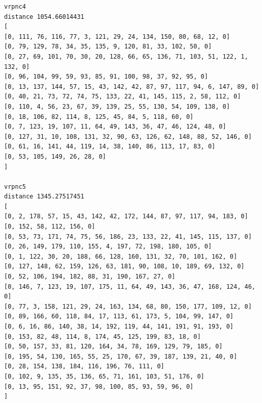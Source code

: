 \documentclass{article} %
\begin{document}
\begin{lstlisting}[breaklines, basicstyle=\tiny]
vrpnc4
distance 1054.66014431
[
[0, 111, 76, 116, 77, 3, 121, 29, 24, 134, 150, 80, 68, 12, 0]
[0, 79, 129, 78, 34, 35, 135, 9, 120, 81, 33, 102, 50, 0]
[0, 27, 69, 101, 70, 30, 20, 128, 66, 65, 136, 71, 103, 51, 122, 1, 132, 0]
[0, 96, 104, 99, 59, 93, 85, 91, 100, 98, 37, 92, 95, 0]
[0, 13, 137, 144, 57, 15, 43, 142, 42, 87, 97, 117, 94, 6, 147, 89, 0]
[0, 40, 21, 73, 72, 74, 75, 133, 22, 41, 145, 115, 2, 58, 112, 0]
[0, 110, 4, 56, 23, 67, 39, 139, 25, 55, 130, 54, 109, 138, 0]
[0, 18, 106, 82, 114, 8, 125, 45, 84, 5, 118, 60, 0]
[0, 7, 123, 19, 107, 11, 64, 49, 143, 36, 47, 46, 124, 48, 0]
[0, 127, 31, 10, 108, 131, 32, 90, 63, 126, 62, 148, 88, 52, 146, 0]
[0, 61, 16, 141, 44, 119, 14, 38, 140, 86, 113, 17, 83, 0]
[0, 53, 105, 149, 26, 28, 0]
]

vrpnc5
distance 1345.27517451
[
[0, 2, 178, 57, 15, 43, 142, 42, 172, 144, 87, 97, 117, 94, 183, 0]
[0, 152, 58, 112, 156, 0]
[0, 53, 73, 171, 74, 75, 56, 186, 23, 133, 22, 41, 145, 115, 137, 0]
[0, 26, 149, 179, 110, 155, 4, 197, 72, 198, 180, 105, 0]
[0, 1, 122, 30, 20, 188, 66, 128, 160, 131, 32, 70, 101, 162, 0]
[0, 127, 148, 62, 159, 126, 63, 181, 90, 108, 10, 189, 69, 132, 0]
[0, 52, 106, 194, 182, 88, 31, 190, 167, 27, 0]
[0, 146, 7, 123, 19, 107, 175, 11, 64, 49, 143, 36, 47, 168, 124, 46, 0]
[0, 77, 3, 158, 121, 29, 24, 163, 134, 68, 80, 150, 177, 109, 12, 0]
[0, 89, 166, 60, 118, 84, 17, 113, 61, 173, 5, 104, 99, 147, 0]
[0, 6, 16, 86, 140, 38, 14, 192, 119, 44, 141, 191, 91, 193, 0]
[0, 153, 82, 48, 114, 8, 174, 45, 125, 199, 83, 18, 0]
[0, 50, 157, 33, 81, 120, 164, 34, 78, 169, 129, 79, 185, 0]
[0, 195, 54, 130, 165, 55, 25, 170, 67, 39, 187, 139, 21, 40, 0]
[0, 28, 154, 138, 184, 116, 196, 76, 111, 0]
[0, 102, 9, 135, 35, 136, 65, 71, 161, 103, 51, 176, 0]
[0, 13, 95, 151, 92, 37, 98, 100, 85, 93, 59, 96, 0]
]
\end{lstlisting}

\newpage
\end{document}
